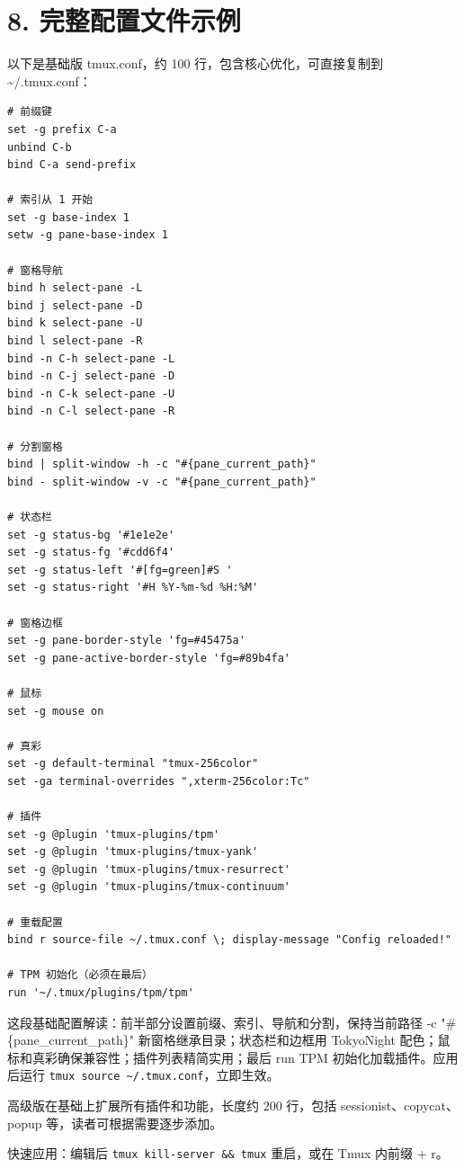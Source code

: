 \chapter{8. 完整配置文件示例}
以下是基础版 tmux.conf，约 100 行，包含核心优化，可直接复制到 \~{}/.tmux.conf：\par
\begin{lstlisting}
# 前缀键
set -g prefix C-a
unbind C-b
bind C-a send-prefix

# 索引从 1 开始
set -g base-index 1
setw -g pane-base-index 1

# 窗格导航
bind h select-pane -L
bind j select-pane -D
bind k select-pane -U
bind l select-pane -R
bind -n C-h select-pane -L
bind -n C-j select-pane -D
bind -n C-k select-pane -U
bind -n C-l select-pane -R

# 分割窗格
bind | split-window -h -c "#{pane_current_path}"
bind - split-window -v -c "#{pane_current_path}"

# 状态栏
set -g status-bg '#1e1e2e'
set -g status-fg '#cdd6f4'
set -g status-left '#[fg=green]#S '
set -g status-right '#H %Y-%m-%d %H:%M'

# 窗格边框
set -g pane-border-style 'fg=#45475a'
set -g pane-active-border-style 'fg=#89b4fa'

# 鼠标
set -g mouse on

# 真彩
set -g default-terminal "tmux-256color"
set -ga terminal-overrides ",xterm-256color:Tc"

# 插件
set -g @plugin 'tmux-plugins/tpm'
set -g @plugin 'tmux-plugins/tmux-yank'
set -g @plugin 'tmux-plugins/tmux-resurrect'
set -g @plugin 'tmux-plugins/tmux-continuum'

# 重载配置
bind r source-file ~/.tmux.conf \; display-message "Config reloaded!"

# TPM 初始化（必须在最后）
run '~/.tmux/plugins/tpm/tpm'
\end{lstlisting}
这段基础配置解读：前半部分设置前缀、索引、导航和分割，保持当前路径 -c "\#{}\{{}pane\_{}current\_{}path\}{}" 新窗格继承目录；状态栏和边框用 TokyoNight 配色；鼠标和真彩确保兼容性；插件列表精简实用；最后 run TPM 初始化加载插件。应用后运行 \texttt{tmux source \~{}/.tmux.conf}，立即生效。\par
高级版在基础上扩展所有插件和功能，长度约 200 行，包括 sessionist、copycat、popup 等，读者可根据需要逐步添加。\par
快速应用：编辑后 \texttt{tmux kill-server \&{}\&{} tmux} 重启，或在 Tmux 内前缀 + r。\par
